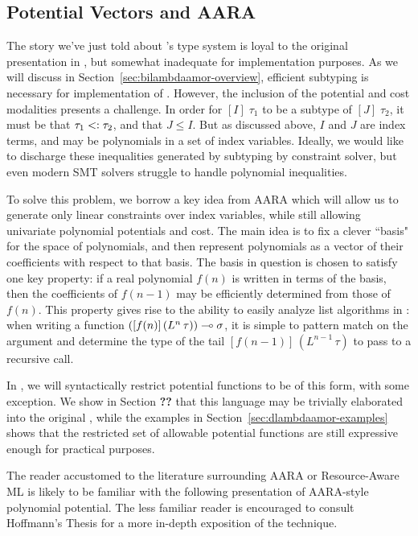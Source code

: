 \subsection{Potential Vectors and AARA}
The story we've just told about \lambdaamor's type system is loyal to the original presentation in \citep{rajani-et-al:popl21}, but somewhat inadequate for implementation purposes. As we will discuss in Section~\ref{sec:bilambdaamor-overview}, efficient subtyping is necessary for implementation of \lambdaamor. However,
the inclusion of the potential and cost modalities presents a challenge. In order for $[I] \; \tau_1$ to be a subtype of $[J] \; \tau_2$, it must be that $\tau_1 <: \tau_2$, and that $J \leq I$. But as discussed above, $I$ and $J$ are index terms, and may be polynomials in a set of index variables. Ideally, we would like to discharge these inequalities generated by subtyping by constraint solver, but even modern SMT solvers struggle to handle polynomial inequalities.

To solve this problem, we borrow a key idea from AARA \cite{hoffmann-et-al:esop10} which will allow us to generate only linear constraints over index variables, while still allowing univariate polynomial potentials and cost. The main idea is to fix a clever ``basis" for the space of polynomials, and then represent polynomials as a vector of their coefficients with respect to that basis. The basis in question is chosen to satisfy one key property: if a real polynomial $f(n)$ is written in terms of the basis, then the coefficients of $f(n-1)$ may be efficiently determined from those of $f(n)$. This property gives rise to the ability to easily analyze list algorithms in \lambdaamor: when writing a function $([f(n)] \, (L^n \, \tau)) \multimap \sigma$, it is simple to pattern match on the argument and determine the type of the tail $[f(n-1)] \, (L^{n-1} \, \tau)$ to pass to a recursive call.

In \dlambdaamor, we will syntactically restrict potential functions to be of this form, with some exception. We show in Section \textbf{??} that this language may be trivially elaborated into the original \lambdaamor, while the examples in Section~\ref{sec:dlambdaamor-examples} shows that the restricted set of allowable potential functions are still expressive enough for practical purposes.

The reader accustomed to the literature surrounding AARA or Resource-Aware ML is likely to be familiar with the following presentation of AARA-style polynomial potential. The less familiar reader is encouraged to consult Hoffmann's Thesis \cite{hoffmann:thesis} for a more in-depth exposition of the technique.

